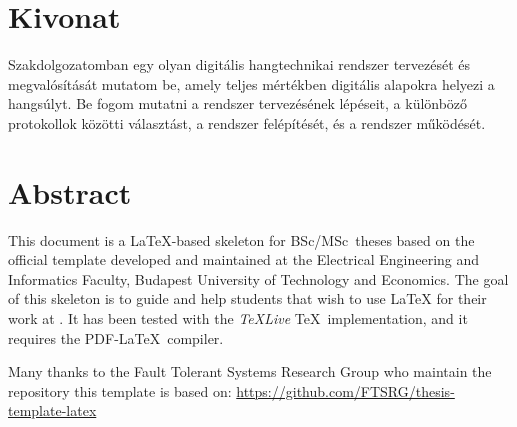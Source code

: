 \setcounter{page}{1}

\selecthungarian

\chapter*{Kivonat}

Szakdolgozatomban egy olyan digitális hangtechnikai rendszer tervezését és megvalósítását mutatom be, amely teljes mértékben digitális alapokra helyezi a hangsúlyt.
Be fogom mutatni a rendszer tervezésének lépéseit, a különböző protokollok közötti választást, a rendszer felépítését, és a rendszer működését.

\vfill
\selectenglish


\chapter*{Abstract}

This document is a \LaTeX-based skeleton for BSc/MSc~theses based on the official template developed and maintained at the Electrical Engineering and Informatics Faculty, Budapest University of Technology and Economics. The goal of this skeleton is to guide and help students that wish to use \LaTeX{} for their work at \sze{} \givk. It has been tested with the \emph{TeXLive} \TeX~implementation, and it requires the PDF-\LaTeX~compiler.

Many thanks to the Fault Tolerant Systems Research Group who maintain the repository this template is based on: \url{https://github.com/FTSRG/thesis-template-latex}


\vfill
\selectthesislanguage

\setcounter{romanPage}{\value{page}}
